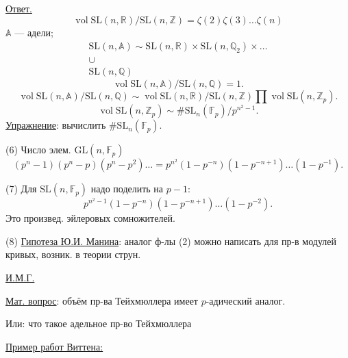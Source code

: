 \underline{Ответ.}
\begin{equation}
 \operatorname{vol}\mathrm{SL}(n,\mathbb R)/\mathrm{SL}(n,\mathbb Z)
 =\zeta(2)\zeta(3)\ldots\zeta(n)
 \tag{2}
\end{equation}
$\mathbb A$ — адели;
\begin{equation}
 \begin{gathered}
 \mathrm{SL}(n,\mathbb A)\sim
 \mathrm{SL}(n,\mathbb R)\times\mathrm{SL}(n,\mathbb Q_2)\times\ldots\\
 \cup\\
 \mathrm{SL}(n,\mathbb Q)
 \end{gathered}
 \tag{3}
\end{equation}
\begin{equation}
 \operatorname{vol}\mathrm{SL}(n,\mathbb A)/\mathrm{SL}(n,\mathbb Q)=1.
 \tag{4}
\end{equation}
\begin{equation*}
 \operatorname{vol}\mathrm{SL}(n,\mathbb A)/\mathrm{SL}(n,\mathbb Q)
 \sim
 \operatorname{vol}\mathrm{SL}(n,\mathbb R)/\mathrm{SL}(n,\mathbb Z)
 \prod\operatorname{vol}\mathrm{SL}(n,\mathbb Z_p).
\end{equation*}
\begin{equation}
 \operatorname{vol}\mathrm{SL}(n,\mathbb Z_p)
 \sim\#\mathrm{SL}_n(\mathbb F_p)/p^{n^2-1}.
 \tag{5}
\end{equation}
\underline{Упражнение}: вычислить $\#\mathrm{SL}_n(\mathbb F_p)$.


(6) Число элем. $\mathrm{GL}(n,\mathbb F_p)$
\begin{equation*}
 (p^n-1)(p^n-p)(p^n-p^2)\ldots
 =
 p^{n^2}(1-p^{-n})(1-p^{-n+1})\ldots(1-p^{-1}).
\end{equation*}

(7) Для $\mathrm{SL}(n,\mathbb F_p)$ надо поделить на $p-1$:
\begin{equation*}
 p^{n^2-1}(1-p^{-n})(1-p^{-n+1})\ldots(1-p^{-2}).
\end{equation*}
Это произвед. эйлеровых сомножителей.

(8) \underline{Гипотеза Ю.И. Манина}: аналог ф-лы (2) можно написать для
пр-в модулей кривых, возник. в теории струн.

\underline{И.М.Г.}

\underline{Мат. вопрос}: объём пр-ва Тейхмюллера имеет $p$-адический аналог.

Или: что такое адельное пр-во Тейхмюллера

\medskip
\underline{Пример  работ Виттена:}

